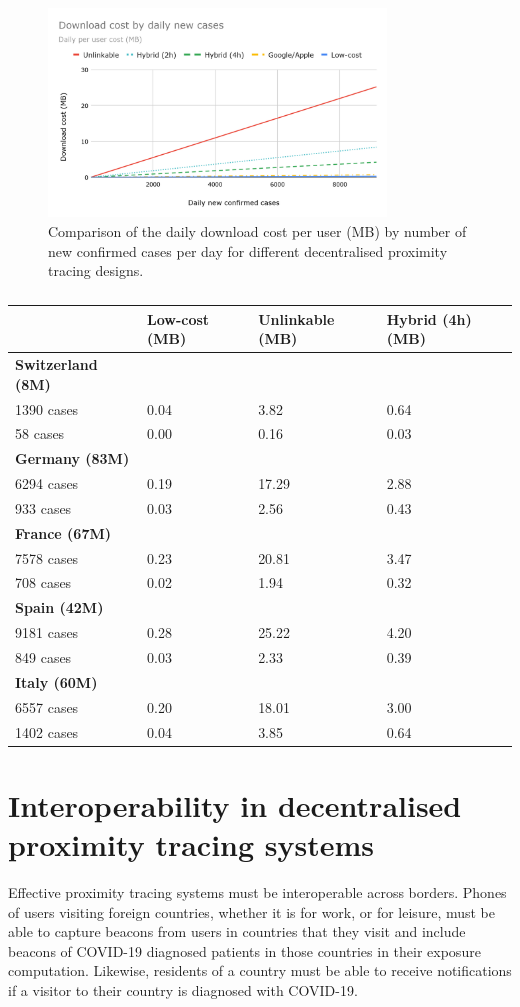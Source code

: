\documentclass{article}
\begin{document}
\begin{figure}\centering
\includegraphics[width=0.8\textwidth]{figs/comparison_decentralized.png}
\caption{Comparison of the daily download cost per user (MB)
by number of new confirmed cases per day for different decentralised
proximity tracing designs.}
\label{fig:comp_decentralized}
\end{figure}

\begin{table}[t]
\centering
\begin{tabular}[]{@{}llll@{}}
\toprule
& \textbf{Low-cost (MB)} & \textbf{Unlinkable (MB)} & \textbf{Hybrid
(4h) (MB)}\tabularnewline
\midrule
\textbf{Switzerland (8M)} & & &\tabularnewline
1390 cases & 0.04 & 3.82 & 0.64\tabularnewline
58 cases & 0.00 & 0.16 & 0.03\tabularnewline
\textbf{Germany (83M)} & & &\tabularnewline
6294 cases & 0.19 & 17.29 & 2.88\tabularnewline
933 cases & 0.03 & 2.56 & 0.43\tabularnewline
\textbf{France (67M)} & & &\tabularnewline
7578 cases & 0.23 & 20.81 & 3.47\tabularnewline
708 cases & 0.02 & 1.94 & 0.32\tabularnewline
\textbf{Spain (42M)} & & &\tabularnewline
9181 cases & 0.28 & 25.22 & 4.20\tabularnewline
849 cases & 0.03 & 2.33 & 0.39\tabularnewline
\textbf{Italy (60M)} & & &\tabularnewline
6557 cases & 0.20 & 18.01 & 3.00\tabularnewline
1402 cases & 0.04 & 3.85 & 0.64\tabularnewline
\bottomrule
\end{tabular}
\caption{}
\end{table}

\section{Interoperability in decentralised proximity tracing
systems}\label{interoperability-in-decentralised-proximity-tracing-systems}

Effective proximity tracing systems must be interoperable across
borders. Phones of users visiting foreign countries, whether it is for
work, or for leisure, must be able to capture beacons from users in
countries that they visit and include beacons of COVID-19 diagnosed
patients in those countries in their exposure computation. Likewise,
residents of a country must be able to receive notifications if a
visitor to their country is diagnosed with COVID-19.
\end{document}

